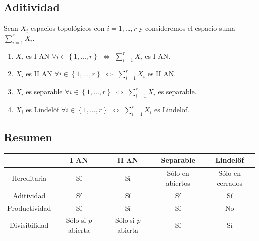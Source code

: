\subsection*{Aditividad}

\begin{prop}
Sean $\displaystyle X_{i} $ espacios topológicos con $\displaystyle i = 1, \ldots, r $ y consideremos el espacio suma $\displaystyle \sum^{r}_{i = 1}X_{i} $. 
\begin{enumerate}
	\item $\displaystyle X_{i} $ es I AN $\displaystyle \forall i \in \left\{ 1, \ldots, r\right\}  $ $\displaystyle \iff  $ $\displaystyle \sum^{r}_{i = 1}X_{i} $ es I AN. 
	\item $\displaystyle X_{i} $ es II AN $\displaystyle \forall i \in \left\{ 1, \ldots, r\right\}  $ $\displaystyle \iff  $ $\displaystyle \sum^{r}_{i = 1}X_{i} $ es II AN. 
	\item $\displaystyle X_{i} $ es separable $\displaystyle \forall i \in \left\{ 1, \ldots, r\right\}  $ $\displaystyle \iff  $ $\displaystyle \sum^{r}_{i = 1}X_{i} $ es separable.
	\item $\displaystyle X_{i} $ es Lindelöf $\displaystyle \forall i \in \left\{ 1, \ldots, r\right\}  $ $\displaystyle \iff  $ $\displaystyle \sum^{r}_{i = 1}X_{i} $ es Lindelöf. 
\end{enumerate}
\end{prop}
\subsection*{Resumen}
\begin{center}
\begin{tabular}{|c|c|c|c|c|}
	\hline
	& I AN & II AN & Separable & Lindelöf \\
	\hline
	Hereditaria & Sí & Sí & Sólo en abiertos & Sólo en cerrados \\
	\hline
	Aditividad & Sí & Sí & Sí & Sí \\
	\hline
	Productividad & Sí & Sí & Sí & No \\
	\hline
	Divisibilidad & Sólo si $\displaystyle p $ abierta & Sólo si $\displaystyle p $ abierta & Sí & Sí \\
	\hline
\end{tabular}

\end{center}

